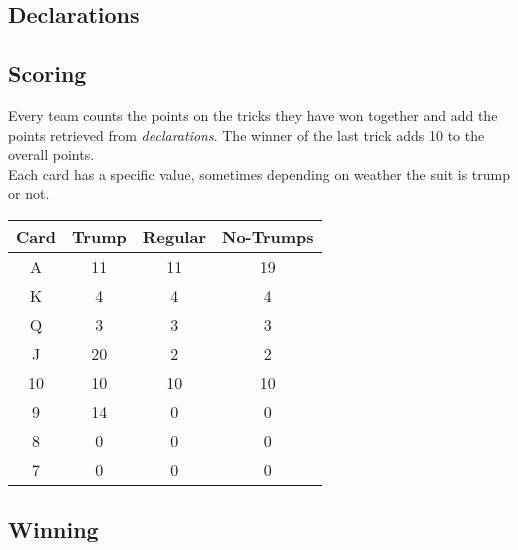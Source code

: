 \subsection{Declarations}

\subsection{Scoring}
Every team counts the points on the tricks they have won together and add the points retrieved from \textit{declarations}.
The winner of the last trick adds 10 to the overall points.\\

Each card has a specific value, sometimes depending on weather the suit is trump or not.
\begin{center}
    \begin{tabular}{|c|c|c|c|}
    \hline
    Card & Trump & Regular & No-Trumps\\
    \hline
    A & 11 & 11 & 19\\
    \hline
    K & 4 & 4 & 4\\
    \hline
    Q & 3 & 3 & 3\\
    \hline
    J & 20 & 2 & 2\\
    \hline
    10 & 10 & 10 & 10\\
    \hline
    9 & 14 & 0 & 0\\
    \hline
    8 & 0 & 0 & 0\\
    \hline
    7 & 0 & 0 & 0\\
    \hline
\end{tabular}
\end{center}

\subsection{Winning}







